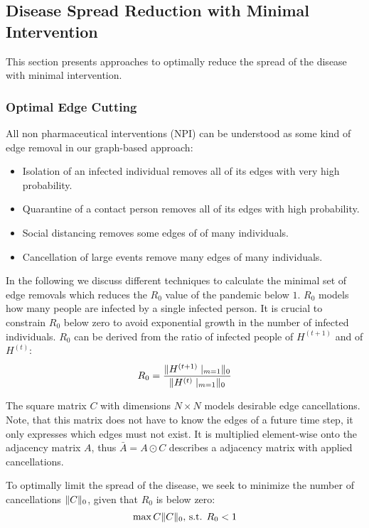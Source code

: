 \documentclass[]{article}
\DeclarePairedDelimiter\norm{\lVert}{\rVert}%
\begin{document}
\subsection{Disease Spread Reduction with Minimal Intervention}
This section presents approaches to optimally reduce the spread of the disease with minimal intervention.

\subsubsection{Optimal Edge Cutting}
All non pharmaceutical interventions (NPI) can be understood as some kind of edge removal in our graph-based approach:
\begin{itemize}
	\item Isolation of an infected individual removes all of its edges with very high probability.
	\item Quarantine of a contact person removes all of its edges with high probability.
	\item Social distancing removes some edges of of many individuals.
	\item Cancellation of large events remove many edges of many individuals.
\end{itemize}
In the following we discuss different techniques to calculate the minimal set of edge removals which reduces the $R_0$ value of the pandemic below $1$.
$R_0$ models how many people are infected by a single infected person.
It is crucial to constrain $R_0$ below zero to avoid exponential growth in the number of infected individuals.
$R_0$ can be derived from the ratio of infected people of $H^{(t+1)}$ and of $H^{(t)}$:
\begin{equation}
	R_0 = \frac{\norm{H^{(t+1)}\mid_{m=1}}_{0}}{\norm{H^{(t)}\mid_{m=1}}_{0}} %
\end{equation}

The square matrix $C$ with dimensions $N \times N$ models desirable edge cancellations.
Note, that this matrix does not have to know the edges of a future time step, it only expresses which edges must not exist.
It is multiplied element-wise onto the adjacency matrix $A$, thus $\bar{A} = A \odot C$ describes a adjacency matrix with applied cancellations.

To optimally limit the spread of the disease, we seek to minimize the number of cancellations $\norm{C}_0$, given that $R_0$ is below zero:
\begin{equation}
	\max{C} \norm{C}_0\text{, s.t. }R_0 < 1
\end{equation}
\end{document}
